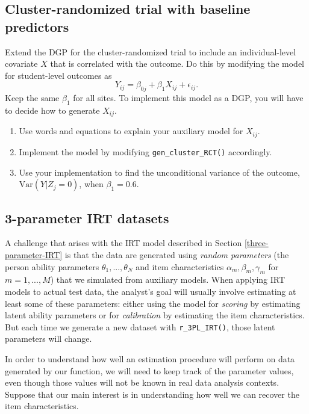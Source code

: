 \documentclass[
]{book}
\providecommand{\tightlist}{%
  \setlength{\itemsep}{0pt}\setlength{\parskip}{0pt}}
\begin{document}
\subsection{Cluster-randomized trial with baseline predictors}\label{cluster-RCT-baseline}

Extend the DGP for the cluster-randomized trial to include an individual-level covariate \(X\) that is correlated with the outcome.
Do this by modifying the model for student-level outcomes as
\[ 
Y_{ij} = \beta_{0j} + \beta_{1} X_{ij} + \epsilon_{ij}. 
\]
Keep the same \(\beta_1\) for all sites.
To implement this model as a DGP, you will have to decide how to generate \(X_{ij}\).

\begin{enumerate}
\def\labelenumi{\arabic{enumi}.}
\tightlist
\item
  Use words and equations to explain your auxiliary model for \(X_{ij}\).
\item
  Implement the model by modifying \texttt{gen\_cluster\_RCT()} accordingly.
\item
  Use your implementation to find the unconditional variance of the outcome, \(\text{Var}(Y | Z_j = 0)\), when \(\beta_1 = 0.6\).
\end{enumerate}

\subsection{3-parameter IRT datasets}\label{IRT-DGP-parameters}

A challenge that arises with the IRT model described in Section \ref{three-parameter-IRT} is that the data are generated using \emph{random parameters} (the person ability parameters \(\theta_1,...,\theta_N\) and item characteristics \(\alpha_m, \beta_m, \gamma_m\) for \(m = 1,...,M\)) that we simulated from auxiliary models.
When applying IRT models to actual test data, the analyst's goal will usually involve estimating at least some of these parameters: either using the model for \emph{scoring} by estimating latent ability parameters or for \emph{calibration} by estimating the item characteristics.
But each time we generate a new dataset with \texttt{r\_3PL\_IRT()}, those latent parameters will change.

In order to understand how well an estimation procedure will perform on data generated by our function, we will need to keep track of the parameter values, even though those values will not be known in real data analysis contexts.
Suppose that our main interest is in understanding how well we can recover the item characteristics.
\end{document}
